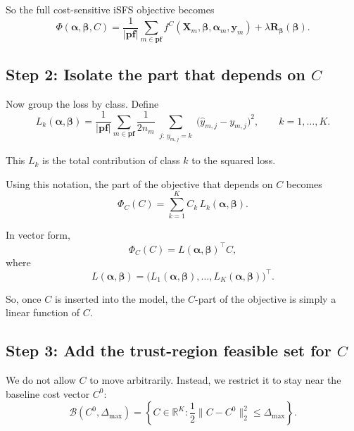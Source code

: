 \documentclass{article}
\begin{document}
So the full cost-sensitive iSFS objective becomes
\begin{equation}
\Phi(\boldsymbol{\alpha},\boldsymbol{\beta},C)
=
\frac{1}{|\mathbf{pf}|}
\sum_{m\in\mathbf{pf}}
f^C(\mathbf X_m,\boldsymbol{\beta},\boldsymbol{\alpha}_m,\mathbf y_m)
+
\lambda \mathbf R_{\boldsymbol{\beta}}(\boldsymbol{\beta}).
\end{equation}

\subsection{Step 2: Isolate the part that depends on $C$}

Now group the loss by class. Define
\begin{equation}
L_k(\boldsymbol{\alpha},\boldsymbol{\beta})
=
\frac{1}{|\mathbf{pf}|}
\sum_{m\in\mathbf{pf}}
\frac{1}{2n_m}
\sum_{\substack{j:\,y_{m,j}=k}}
\big(\hat y_{m,j}-y_{m,j}\big)^2,
\qquad k=1,\dots,K.
\end{equation}

This $L_k$ is the total contribution of class $k$ to the squared loss.

Using this notation, the part of the objective that depends on $C$ becomes
\begin{equation}
\Phi_C(C)
=
\sum_{k=1}^{K} C_k\,L_k(\boldsymbol{\alpha},\boldsymbol{\beta}).
\end{equation}

In vector form,
\begin{equation}
\Phi_C(C)=L(\boldsymbol{\alpha},\boldsymbol{\beta})^\top C,
\end{equation}
where
\begin{equation}
L(\boldsymbol{\alpha},\boldsymbol{\beta})
=
\big(L_1(\boldsymbol{\alpha},\boldsymbol{\beta}),\dots,L_K(\boldsymbol{\alpha},\boldsymbol{\beta})\big)^\top.
\end{equation}

So, once $C$ is inserted into the model, the $C$-part of the objective is simply a linear function of $C$.

\subsection{Step 3: Add the trust-region feasible set for $C$}

We do not allow $C$ to move arbitrarily.  
Instead, we restrict it to stay near the baseline cost vector $C^0$:
\begin{equation}
\mathcal B(C^0,\Delta_{\max})
=
\left\{
C\in\mathbb R^K:
\frac12\|C-C^0\|_2^2\le \Delta_{\max}
\right\}.
\end{equation}
\end{document}
